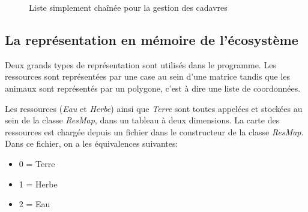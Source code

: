 \documentclass[a4paper,11pt,final,oneside]{article}
\begin{document}
\begin{figure}[h!]
\centering		
{}
\caption{Liste simplement chaînée pour la gestion des cadavres}
\label{fig:rep}
\end{figure}

		\subsection{La représentation en mémoire de l'écosystème}
Deux grands types de représentation sont utilisés dans le programme. Les ressources sont représentées par une case au sein d'une matrice tandis que les animaux sont représentés par un polygone, c'est à dire une liste de coordonnées.

Les ressources (\textit{Eau} et \textit{Herbe}) ainsi que \textit{Terre} sont toutes appelées et stockées au sein de la classe \textit{ResMap}, dans un tableau à deux dimensions. La carte des ressources est chargée depuis un fichier dans le constructeur de la classe \textit{ResMap}. Dans ce fichier, on a les équivalences suivantes:
\medskip
\begin{itemize}
	\item 0 = Terre
	\item 1 = Herbe
	\item 2 = Eau
\end{itemize}
\medskip
\end{document}
